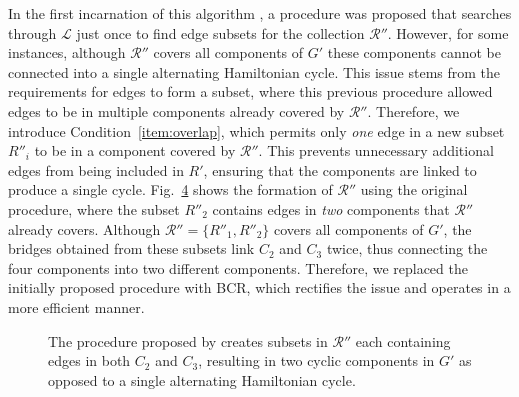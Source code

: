 \documentclass[a4paper,11pt,authoryear]{elsarticle}
\begin{document}
\noindent In the first incarnation of this algorithm \citep{becker2010}, a procedure was proposed that searches through $\mathcal{L}$ just once to find edge subsets for the collection $\mathcal{R}''$. However, for some instances, although $\mathcal{R}''$ covers all components of $G'$ these components cannot be connected into a single alternating Hamiltonian cycle. This issue stems from the requirements for edges to form a subset, where this previous procedure allowed edges to be in multiple components already covered by $\mathcal{R}''$. Therefore, we introduce Condition~\ref{item:overlap}, which permits only \emph{one} edge in a new subset $R''_i$ to be in a component covered by $\mathcal{R}''$. This prevents unnecessary additional edges from being included in $R'$, ensuring that the components are linked to produce a single cycle. Fig.~\ref{fig:overlaperror} shows the formation of $\mathcal{R}''$ using the original procedure, where the subset $R''_2$ contains edges in \emph{two} components that $\mathcal{R}''$ already covers. Although $\mathcal{R}'' = \{R''_1, R''_2\}$ covers all components of $G'$, the bridges obtained from these subsets link $C_2$ and $C_3$ twice, thus connecting the four components into two different components. Therefore, we replaced the initially proposed procedure with BCR, which rectifies the issue and operates in a more efficient manner.

\begin{figure}[h!]
	\centering	
	\begin{subfigure}[h]{0.35\textwidth}
		
		\caption{}
		\label{fig:bcrerror}
	\end{subfigure} \hspace{5mm}
	\begin{subfigure}[h]{0.25\textwidth}
		
		\caption{}
		\label{fig:mpsconnecterror}
	\end{subfigure} \hspace{5mm}
	\begin{subfigure}[h]{0.25\textwidth}
		
		\caption{}
		\label{fig:mpscycleerror}
	\end{subfigure}
	\caption{The procedure proposed by \cite{becker2010} creates subsets in $\mathcal{R}''$ each containing edges in both $C_2$ and $C_3$, resulting in two cyclic components in $G'$ as opposed to a single alternating Hamiltonian cycle.}	
	\label{fig:overlaperror}
\end{figure}
\end{document}
